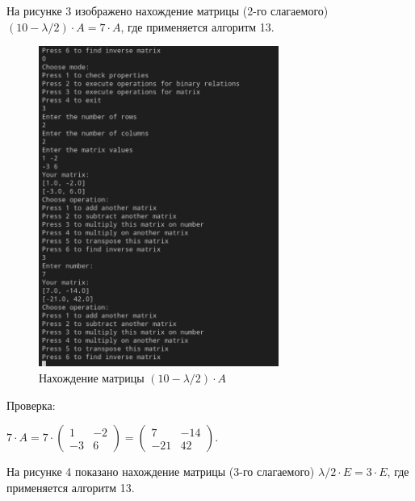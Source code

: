 \documentclass[bachelor, och, labwork]{shiza}
\begin{document}
        На рисунке 3 изображено нахождение матрицы (2-го слагаемого) $(10 - \lambda / 2) \cdot A = 7 \cdot A$, где применяется алгоритм 13.
    
        \begin{figure}[H]
            \centering
            \includegraphics[width=0.7\textwidth]{photo/3.png}
            \caption{Нахождение матрицы $(10 - \lambda / 2) \cdot A$}
        \end{figure}

        Проверка:
        
        $ 7 \cdot A = 7 \cdot
        \begin{pmatrix}
            1 & -2 \\
            -3 & 6
        \end{pmatrix} =
        \begin{pmatrix}
            7 & -14 \\
            -21 & 42
        \end{pmatrix}$.

        На рисунке 4 показано нахождение матрицы (3-го слагаемого) $\lambda / 2 \cdot E = 3 \cdot E$, где применяется алгоритм 13.
    
\end{document}

